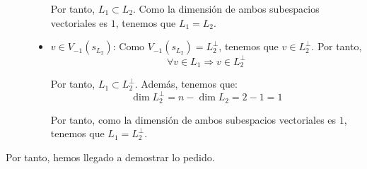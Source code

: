 \begin{ejercicio}
\begin{description}
\begin{itemize}
            Por tanto, $L_1\subset L_2$. Como la dimensión de ambos subespacios vectoriales es $1$, tenemos que $L_1=L_2$.

            \item \underline{$v\in V_{-1}(s_{L_2})$}: Como $V_{-1}(s_{L_2})=L_2^\perp$, tenemos que $v\in L_2^\perp$. Por tanto,
            \begin{equation*}
                \forall v\in L_1 \Longrightarrow v\in L_2^\perp
            \end{equation*}

            Por tanto, $L_1\subset L_2^\perp$. Además, tenemos que:
            \begin{equation*}
                \dim L_2^\perp = n -\dim L_2 = 2-1 = 1
            \end{equation*}
            
            Por tanto, como la dimensión de ambos subespacios vectoriales es $1$, tenemos que $L_1=L_2^\perp$.
        \end{itemize}
    \end{description}

    Por tanto, hemos llegado a demostrar lo pedido.

\end{ejercicio}

